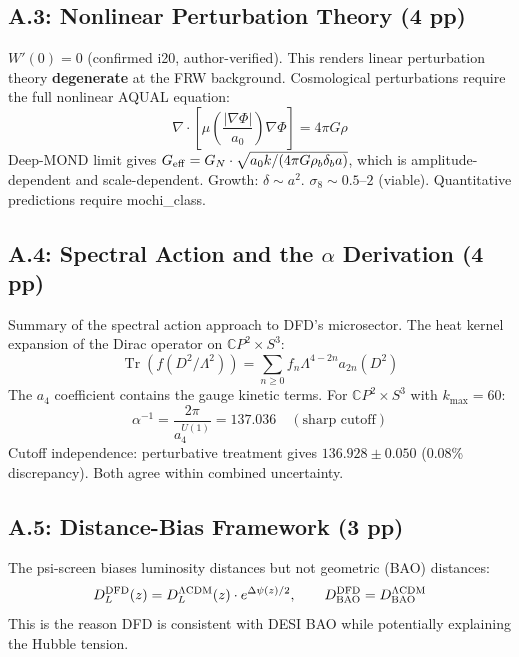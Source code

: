 \documentclass[11pt,a4paper]{article}
\newcommand{\Tr}{\operatorname{Tr}}
\newcommand{\CP}{\mathbb{C}P}
\begin{document}
\subsection{A.3: Nonlinear Perturbation Theory (4 pp)}

$W'(0) = 0$ (confirmed i20, author-verified). This renders linear perturbation theory \textbf{degenerate} at the FRW background. Cosmological perturbations require the full nonlinear AQUAL equation:
\begin{equation}
\nabla \cdot \left[\mu\!\left(\frac{|\nabla\Phi|}{a_0}\right) \nabla\Phi\right] = 4\pi G \rho
\end{equation}
Deep-MOND limit gives $G_{\rm eff} = G_N \cdot \sqrt{a_0 k / (4\pi G \rho_b \delta_b a)}$, which is amplitude-dependent and scale-dependent. Growth: $\delta \sim a^2$. $\sigma_8 \sim 0.5$--$2$ (viable). Quantitative predictions require mochi\_class.

\subsection{A.4: Spectral Action and the $\alpha$ Derivation (4 pp)}

Summary of the spectral action approach to DFD's microsector. The heat kernel expansion of the Dirac operator on $\CP^2 \times S^3$:
\begin{equation}
\Tr(f(D^2/\Lambda^2)) = \sum_{n \geq 0} f_n \Lambda^{4-2n} a_{2n}(D^2)
\end{equation}
The $a_4$ coefficient contains the gauge kinetic terms. For $\CP^2 \times S^3$ with $k_{\max} = 60$:
\begin{equation}
\alpha^{-1} = \frac{2\pi}{a_4^{U(1)}} = 137.036 \quad (\text{sharp cutoff})
\end{equation}
Cutoff independence: perturbative treatment gives $136.928 \pm 0.050$ (0.08\% discrepancy). Both agree within combined uncertainty.

\subsection{A.5: Distance-Bias Framework (3 pp)}

The psi-screen biases luminosity distances but not geometric (BAO) distances:
\begin{equation}
D_L^{\rm DFD}(z) = D_L^{\Lambda\text{CDM}}(z) \cdot e^{\Delta\psi(z)/2}, \qquad D_{\rm BAO}^{\rm DFD} = D_{\rm BAO}^{\Lambda\text{CDM}}
\end{equation}
This is the reason DFD is consistent with DESI BAO while potentially explaining the Hubble tension.
\end{document}
